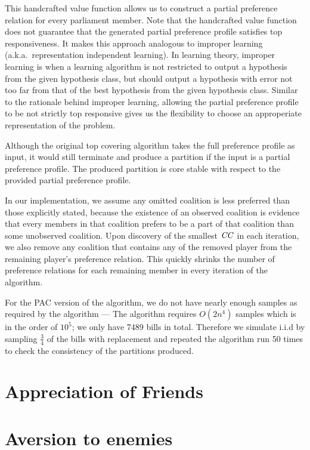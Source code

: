 This handcrafted value function allows us to construct a partial preference
relation for every parliament member.
Note that the handcrafted value function does not guarantee that the generated partial preference profile satisfies top responsiveness.
It makes this approach analogous to improper learning (a.k.a.\ representation independent learning).
In learning theory, improper learning is when a learning algorithm is not
restricted to output a hypothesis from the given hypothesis class,
but should output a hypothesis with error not too far from that of
the best hypothesis from the given hypothesis class.
Similar to the rationale behind improper learning, allowing the
partial preference profile to be not strictly top responsive gives us
the flexibility to choose an approperiate representation of the problem.

Although the original top covering algorithm takes the full preference
profile as input, it would still terminate and produce a partition
if the input is a partial preference profile.
The produced partition is core stable with respect to the provided partial
preference profile.

In our implementation, we assume any omitted coalition is less preferred
than those explicitly stated, because the existence of an observed
coalition is evidence that every members in that coalition prefers to be
a part of that coalition than some unobserved coalition.
Upon discovery of the smallest $\mathit{CC}$ in each iteration, we also remove any coalition that contains any of the removed player from the remaining player's preference relation. This quickly shrinks the number of preference relations for each remaining member in every iteration of the algorithm.

For the PAC version of the algorithm, we do not have nearly enough samples
as required by the algorithm --- The algorithm requires $O(2n^4)$ samples
which is in the order of $10^5$; we only have 7489 bills in total.
Therefore we simulate i.i.d by sampling $\frac{3}{4}$ of the bills
with replacement and repeated the algorithm run 50 times to check
the consistency of the partitions produced.

\section{Appreciation of Friends}
\section{Aversion to enemies}
